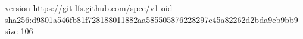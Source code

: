 version https://git-lfs.github.com/spec/v1
oid sha256:d9801a546fb81f728188011882aa585505876228297c45a82262d2bda9eb9bb9
size 106
